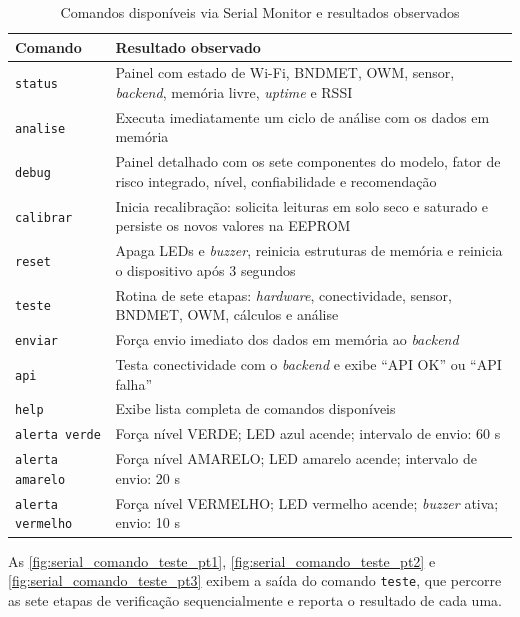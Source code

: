 \begin{table}[htb]
\centering
\caption{Comandos disponíveis via Serial Monitor e resultados observados}
\label{tab:comandos_serial}
\begin{tabular}{lp{9.5cm}}
\hline
\textbf{Comando} & \textbf{Resultado observado} \\
\hline
\texttt{status}          & Painel com estado de Wi-Fi, BNDMET, OWM, sensor, \textit{backend}, memória livre, \textit{uptime} e RSSI \\
\texttt{analise}         & Executa imediatamente um ciclo de análise com os dados em memória \\
\texttt{debug}           & Painel detalhado com os sete componentes do modelo, fator de risco integrado, nível, confiabilidade e recomendação \\
\texttt{calibrar}        & Inicia recalibração: solicita leituras em solo seco e saturado e persiste os novos valores na EEPROM \\
\texttt{reset}           & Apaga LEDs e \textit{buzzer}, reinicia estruturas de memória e reinicia o dispositivo após 3 segundos \\
\texttt{teste}           & Rotina de sete etapas: \textit{hardware}, conectividade, sensor, BNDMET, OWM, cálculos e análise \\
\texttt{enviar}          & Força envio imediato dos dados em memória ao \textit{backend} \\
\texttt{api}             & Testa conectividade com o \textit{backend} e exibe ``API OK'' ou ``API falha'' \\
\texttt{help}            & Exibe lista completa de comandos disponíveis \\
\texttt{alerta verde}    & Força nível VERDE; LED azul acende; intervalo de envio: 60 s \\
\texttt{alerta amarelo}  & Força nível AMARELO; LED amarelo acende; intervalo de envio: 20 s \\
\texttt{alerta vermelho} & Força nível VERMELHO; LED vermelho acende; \textit{buzzer} ativa; envio: 10 s \\
\hline
\end{tabular}
\end{table}

As \autoref{fig:serial_comando_teste_pt1},
\autoref{fig:serial_comando_teste_pt2} e
\autoref{fig:serial_comando_teste_pt3} exibem a saída do comando \texttt{teste}, que percorre as sete etapas de verificação sequencialmente e reporta o resultado de cada uma.

